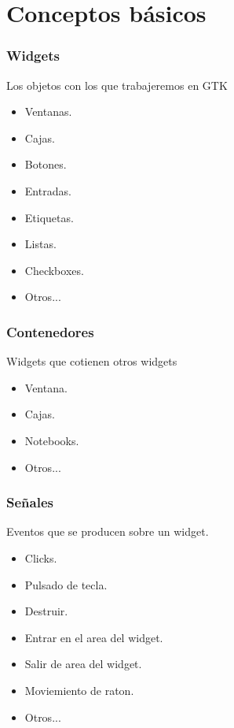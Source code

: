 \documentclass[10pt]{beamer}
\begin{document}
  \section{Conceptos básicos}
  \begin{frame}[containsverbatim]
    \frametitle{Widgets}
  
    Los objetos con los que trabajeremos en GTK
    \begin{itemize}
      \item Ventanas.
      \item Cajas.
      \item Botones.
      \item Entradas.
      \item Etiquetas.
      \item Listas.
      \item Checkboxes.
      \item Otros...
    \end{itemize}
  \end{frame}
  
  \begin{frame}[containsverbatim]
    \frametitle{Contenedores}
  
    Widgets que cotienen otros widgets
    \begin{itemize}
      \item Ventana.
      \item Cajas.
      \item Notebooks.
      \item Otros...
    \end{itemize}
  \end{frame}
  
  \begin{frame}[containsverbatim]
    \frametitle{Señales}
  
    Eventos que se producen sobre un widget.
    \begin{itemize}
      \item Clicks.
      \item Pulsado de tecla.
      \item Destruir.
      \item Entrar en el area del widget.
      \item Salir de area del widget.
      \item Moviemiento de raton.
      \item Otros...
    \end{itemize}
  \end{frame}
\end{document}
